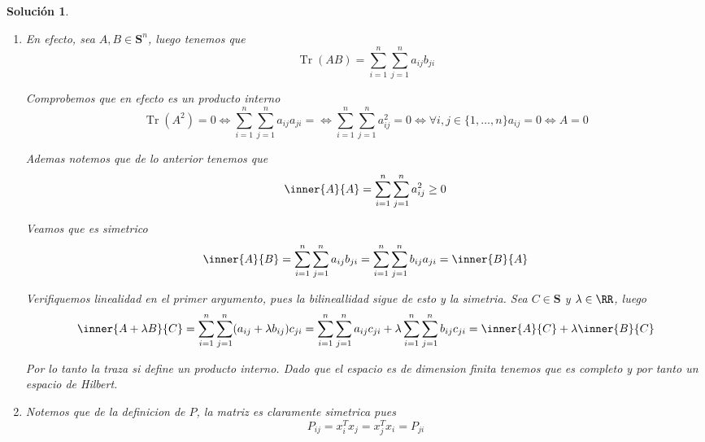 \documentclass[a4paper,oneside,10.5pt]{USMArt}
\DeclareMathOperator{\tr}{Tr}
\newtheorem{sol}{Soluci\'on}
\begin{document}
\begin{sol}\hfill
  \begin{enumerate}
    \item En efecto, sea $A, B \in \mathbf{S}^n$, luego tenemos que
          \begin{equation*}
            \tr(AB) = \sum_{i = 1}^{n} \sum_{j = 1}^n a_{ij}b_{ji}
          \end{equation*}

          Comprobemos que en efecto es un producto interno
          \begin{equation*}
            \tr(A^2) = 0 \iff \sum_{i = 1}^n \sum_{j = 1}^n a_{ij}a_{ji} = \iff \sum_{i = 1}^n \sum_{j = 1}^n a_{ij}^2 = 0 \iff \forall i,j \in \{1, \dots, n\} a_{ij} = 0 \iff A = 0
          \end{equation*}

          Ademas notemos que de lo anterior tenemos que
          \begin{equation*}
            \inner{A}{A} = \sum_{i = 1}^n \sum_{j = 1}^n a_{ij}^2 \geq 0
          \end{equation*}

          Veamos que es simetrico
          \begin{equation*}
            \inner{A}{B} = \sum_{i = 1}^n \sum_{j = 1}^n a_{ij} b_{ji} = \sum_{i = 1}^n \sum_{j = 1}^n b_{ij} a_{ji} = \inner{B}{A}
          \end{equation*}

          Verifiquemos linealidad en el primer argumento, pues la bilineallidad sigue
          de esto y la simetria. Sea $C \in \mathbf{S}$ y $\lambda \in \RR$, luego
          \begin{equation*}
            \inner{A + \lambda B}{C} = \sum_{i = 1}^n \sum_{j = 1}^n (a_{ij} + \lambda b_{ij}) c_{ji} = \sum_{i = 1}^n \sum_{j = 1}^n a_{ij} c_{ji} + \lambda \sum_{i = 1}^n \sum_{j = 1}^n b_{ij} c_{ji} = \inner{A}{C} + \lambda \inner{B}{C}
          \end{equation*}

          Por lo tanto la traza si define un producto interno. Dado que el espacio es
          de dimension finita tenemos que es completo y por tanto un espacio de Hilbert.

    \item Notemos que de la definicion de $P$, la matriz es claramente simetrica
          pues
          \begin{equation*}
            P_{ij} = x_i^Tx_j = x_j^Tx_i = P_{ji}
          \end{equation*}


\end{enumerate}
\end{sol}
\end{document}
